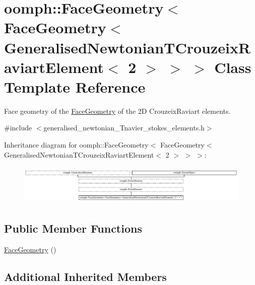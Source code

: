 \hypertarget{classoomph_1_1FaceGeometry_3_01FaceGeometry_3_01GeneralisedNewtonianTCrouzeixRaviartElement_3_012_01_4_01_4_01_4}{}\section{oomph\+:\+:Face\+Geometry$<$ Face\+Geometry$<$ Generalised\+Newtonian\+T\+Crouzeix\+Raviart\+Element$<$ 2 $>$ $>$ $>$ Class Template Reference}
\label{classoomph_1_1FaceGeometry_3_01FaceGeometry_3_01GeneralisedNewtonianTCrouzeixRaviartElement_3_012_01_4_01_4_01_4}


Face geometry of the \hyperlink{classoomph_1_1FaceGeometry}{Face\+Geometry} of the 2D Crouzeix\+Raviart elements.  




{\ttfamily \#include $<$generalised\+\_\+newtonian\+\_\+\+Tnavier\+\_\+stokes\+\_\+elements.\+h$>$}

Inheritance diagram for oomph\+:\+:Face\+Geometry$<$ Face\+Geometry$<$ Generalised\+Newtonian\+T\+Crouzeix\+Raviart\+Element$<$ 2 $>$ $>$ $>$\+:\begin{figure}[H]
\begin{center}
\leavevmode
\includegraphics[height=1.944445cm]{classoomph_1_1FaceGeometry_3_01FaceGeometry_3_01GeneralisedNewtonianTCrouzeixRaviartElement_3_012_01_4_01_4_01_4}
\end{center}
\end{figure}
\subsection*{Public Member Functions}
\begin{DoxyCompactItemize}
\item 
\hyperlink{classoomph_1_1FaceGeometry_3_01FaceGeometry_3_01GeneralisedNewtonianTCrouzeixRaviartElement_3_012_01_4_01_4_01_4_a2c0b9faf48d7bc3220741d0413718676}{Face\+Geometry} ()
\end{DoxyCompactItemize}
\subsection*{Additional Inherited Members}


